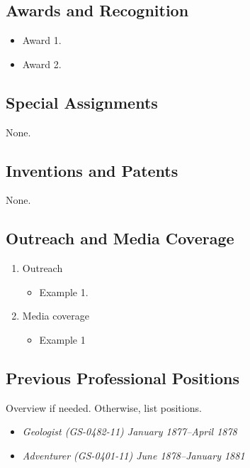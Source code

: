 \subsection{Awards and Recognition}

\begin{itemize}
\item Award 1.
\item Award 2.
  
\end{itemize}


\subsection{Special Assignments}

None.

\subsection{Inventions and Patents}

None.

\subsection{Outreach and Media Coverage}

\begin{enumerate}
\item Outreach
  \begin{itemize}
  \item Example 1.
  \end{itemize}
  
\item Media coverage\label{sec:TITD}

  \begin{itemize}
  \item Example 1
  \end{itemize}
\end{enumerate}

\subsection{Previous Professional Positions}

Overview if needed.
Otherwise, list positions.

\begin{itemize}
\item \textit{Geologist (GS-0482-11) \hfill January 1877--April 1878}
\item \textit{Adventurer (GS-0401-11)  	 \hfill June 1878--January
    1881} 
\end{itemize}


